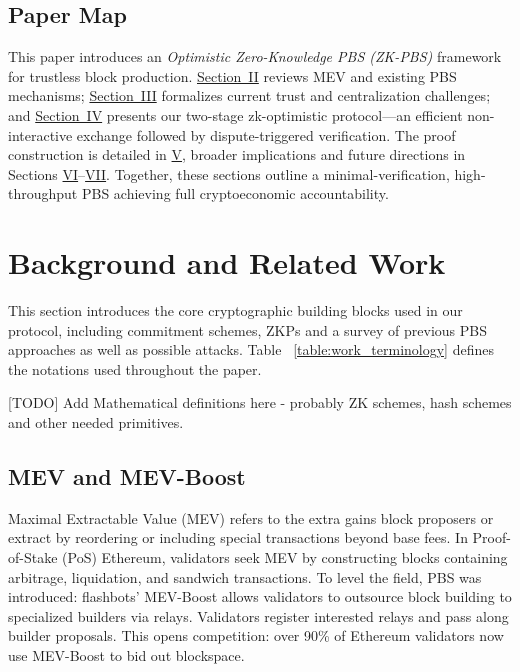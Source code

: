 \documentclass[11pt]{article}
\begin{document}
\subsection{Paper Map}

This paper introduces an \emph{Optimistic Zero-Knowledge PBS (ZK-PBS)} framework for trustless block production. \hyperref[sec:mev]{Section~II} reviews MEV and existing PBS mechanisms; \hyperref[sec:problem]{Section~III} formalizes current trust and centralization challenges; and \hyperref[sec:architecture]{Section~IV} presents our two-stage zk-optimistic protocol—an efficient non-interactive exchange followed by dispute-triggered verification. The proof construction is detailed in \hyperref[sec:proving_blocks]{V}, broader implications and future directions in Sections \hyperref[sec:disscusion]{VI}–\hyperref[sec:future_work]{VII}. Together, these sections outline a minimal-verification, high-throughput PBS achieving full cryptoeconomic accountability.


\section{Background and Related Work}
This section introduces the core cryptographic building blocks used in our protocol, including commitment schemes, ZKPs and a survey of previous PBS approaches as well as possible attacks.
Table ~\ref{table:work_terminology} defines the notations used throughout the paper.



[TODO] Add Mathematical definitions here - probably ZK schemes, hash schemes and other needed primitives.

\subsection{MEV and MEV-Boost}
\label{sec:mev}
Maximal Extractable Value (MEV) refers to the extra gains block proposers or extract by reordering or including special transactions beyond base fees. In Proof-of-Stake (PoS) Ethereum, validators seek MEV by constructing blocks containing arbitrage, liquidation, and sandwich transactions. To level the field, PBS was introduced: flashbots’ MEV-Boost allows validators to outsource block building to specialized builders via relays. Validators register interested relays and pass along builder proposals. This opens competition: over 90\% of Ethereum validators now use MEV-Boost to bid out blockspace.
\end{document}
